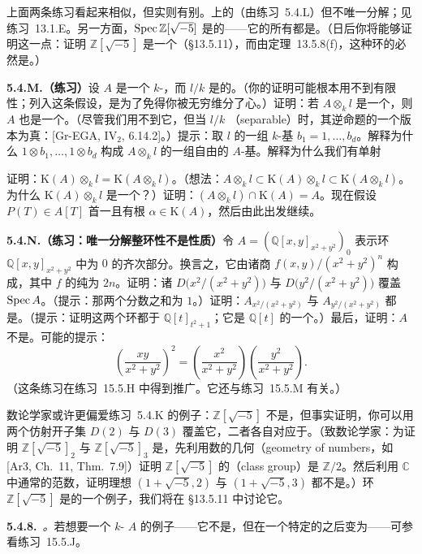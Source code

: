 上面两条练习看起来相似，但实则有别。\trQuadricSurface{}上的\trCone{}\trNormal（由练习~5.4.L）但不唯一分解；见练习~13.1.E。另一方面，$\operatorname{Spec}\mathbb{Z}[\sqrt{-5}]$ 是\trFactorial{}的——它的所有\trStalk{}都是\trUFD。（日后你将能够证明这一点：证明 $\mathbb{Z}[\sqrt{-5}]$ 是一个\trDedekind\trIntegralDomain（\S13.5.11），而由定理~13.5.8(f)，这种环的\trStalk{}必然是\trUFD。）

\textbf{5.4.M.（练习）}\quad 设 $A$ 是一个 $k$-\trAlgebra，而 $l/k$ 是\trField{}的\trFiniteFieldExtension。（你的证明可能根本用不到有限性；列入这条假设，是为了免得你被无穷维\trVectorSpace{}分了心。）证明：若 $A\otimes_k l$ 是一个\trNormal{}\trIntegralDomain，则 $A$ 也是一个\trNormal{}\trIntegralDomain。（尽管我们用不到它，但当 $l/k$ \trSeparable{}（separable）时，其逆命题的一个版本为真：[Gr-EGA, IV$_2$, 6.14.2]。）提示：取 $l$ 的一组 $k$-基 $b_1=1,\dots,b_d$。解释为什么 $1\otimes b_1,\dots,1\otimes b_d$ 构成 $A\otimes_k l$ 的一组自由的 $A$-基。解释为什么我们有单射
证明：$\mathrm{K}(A)\otimes_k l=\mathrm{K}(A\otimes_k l)$。（想法：$A\otimes_k l\subset\mathrm{K}(A)\otimes_k l\subset\mathrm{K}(A\otimes_k l)$。为什么 $\mathrm{K}(A)\otimes_k l$ 是一个\trField？）证明：$(A\otimes_k l)\cap\mathrm{K}(A)=A$。现在假设 $P(T)\in A[T]$ 首一且有根 $\alpha\in\mathrm{K}(A)$，然后由此出发继续。

\textbf{5.4.N.（练习：唯一分解整环性不是\trAffineLocal{}性质）}\quad 令 $A=(\mathbb{Q}[x,y]_{x^2+y^2})_0$ 表示环 $\mathbb{Q}[x,y]_{x^2+y^2}$ 中\trDegree{}为 $0$ 的齐次部分。换言之，它由诸商 $f(x,y)/(x^2+y^2)^n$ 构成，其中 $f$ 的\trDegree{}纯为 $2n$。证明：诸\trDistinguishedOpen{} $D\bigl(x^2/(x^2+y^2)\bigr)$ 与 $D\bigl(y^2/(x^2+y^2)\bigr)$ 覆盖 $\operatorname{Spec} A$。（提示：那两个分数之和为 $1$。）证明：$A_{x^2/(x^2+y^2)}$ 与 $A_{y^2/(x^2+y^2)}$ 都是\trUFD。（提示：证明这两个环都\trIsomorphic{}于 $\mathbb{Q}[t]_{t^2+1}$；它是\trUFD{} $\mathbb{Q}[t]$ 的一个\trLocalization。）最后，证明：$A$ 不是\trUFD。可能的提示：
\begin{equation*}
\left(\frac{xy}{x^2+y^2}\right)^{2}
=\left(\frac{x^2}{x^2+y^2}\right)\left(\frac{y^2}{x^2+y^2}\right).
\end{equation*}
（这条练习在练习~15.5.H 中得到推广。它还与练习~15.5.M 有关。）

数论学家或许更偏爱练习~5.4.K 的例子：$\mathbb{Z}[\sqrt{-5}]$ 不是\trUFD，但事实证明，你可以用两个仿射开子集 $D(2)$ 与 $D(3)$ 覆盖它，二者各自对应于\trUFD。（致数论学家：为证明 $\mathbb{Z}[\sqrt{-5}]_2$ 与 $\mathbb{Z}[\sqrt{-5}]_3$ 是\trUFD，先利用数的几何（geometry of numbers，如 [Ar3, Ch.~11, Thm.~7.9]）证明 $\mathbb{Z}[\sqrt{-5}]$ 的\textbf{\trClassGroup{}}（class group）是 $\mathbb{Z}/2$。然后利用 $\mathbb{C}$ 中通常的范数，证明理想 $(1+\sqrt{-5},2)$ 与 $(1+\sqrt{-5},3)$ 都不是\trPrincipalIdeal。）环 $\mathbb{Z}[\sqrt{-5}]$ 是\trDedekind\trIntegralDomain{}的一个例子，我们将在 \S13.5.11 中讨论它。

\textbf{5.4.8.}\ \emph{\trhRemark{}。}\quad 若想要一个 $k$-\trAlgebra{} $A$ 的例子——它不是\trUFD，但在一个特定的\trFieldExtension{}之后变为\trUFD——可参看练习~15.5.J。
